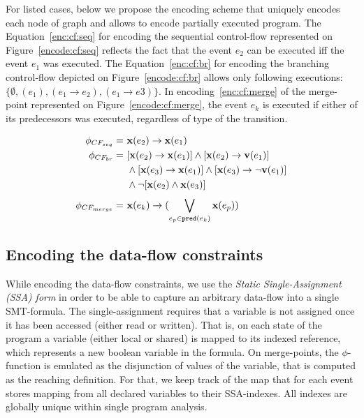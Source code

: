 For listed cases, below we propose the encoding scheme that uniquely encodes each node of graph and allows to encode partially executed program.
The Equation~\ref{enc:cf:seq} for encoding the sequential control-flow represented on Figure~\ref{encode:cf:seq} reflects the fact that the event $e_2$ can be executed iff the event $e_1$ was executed. The Equation~\ref{enc:cf:br} for encoding the branching control-flow depicted on Figure~\ref{encode:cf:br} allows only following executions: $\{\emptyset, (e_1), (e_1 \rightarrow e_2), (e_1 \rightarrow e3) \}$. In encoding~\ref{enc:cf:merge} of the merge-point represented on Figure~\ref{encode:cf:merge}, the event $e_k$ is executed if either of its predecessors was executed, regardless of type of the transition.

\begin{align}
\phi_{CF_{seq}}   = \ & \mathbf{x}(e_2) \rightarrow \mathbf{x}(e_1) \label{enc:cf:seq} \\
\phi_{CF_{br}}    = \ & [\mathbf{x}(e_2) \rightarrow \mathbf{x}(e_1)] \land [\mathbf{x}(e_2) \rightarrow \mathbf{v}(e_1)] \nonumber \\
				  & \land  [\mathbf{x}(e_3) \rightarrow \mathbf{x}(e_1)] \land [\mathbf{x}(e_3) \rightarrow \lnot\mathbf{v}(e_1)] \nonumber \\
				  & \land \lnot [\mathbf{x}(e_2) \land \mathbf{x}(e_3)]  \label{enc:cf:br} \\
\phi_{CF_{merge}} = \ & \mathbf{x}(e_k) \rightarrow (\bigvee\limits_{e_p \in \mathtt{pred}(e_k)}^{} \mathbf{x}(e_p)) \label{enc:cf:merge}
\end{align}

\subsection{Encoding the data-flow constraints}
\label{ch:port:enc:df}

While encoding the data-flow constraints, we use the \textit{Static Single-Assignment (SSA) form} in order to be able to capture an arbitrary data-flow into a single SMT-formula. The single-assignment requires that a variable is not assigned once it has been accessed (either read or written). That is, on each state of the program a variable (either local or shared) is mapped to its indexed reference, which represents a new boolean variable in the formula. On merge-points, the $\phi$-function is emulated as the disjunction of values of the variable, that is computed as the reaching definition. For that, we keep track of the map that for each event stores mapping from all declared variables to their SSA-indexes. All indexes are globally unique within single program analysis.

